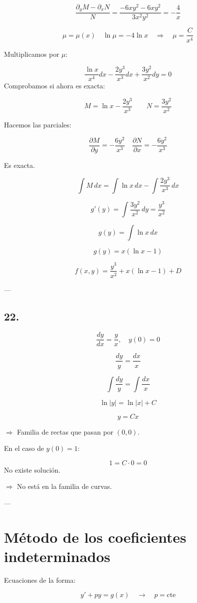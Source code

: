 \documentclass[a4paper,12pt]{article}
\begin{document}
\[
\frac{\partial_y M - \partial_x N}{N} = \frac{-6xy^2 - 6xy^2}{3x^2 y^2} = -\frac{4}{x}
\]

\[
\mu = \mu(x) \quad \ln \mu = -4 \ln x \quad \Rightarrow \quad \mu = \frac{C}{x^4}
\]

Multiplicamos por $\mu$:

\[
\frac{\ln x}{x^4} dx - \frac{2y^3}{x^3} dx + \frac{3y^2}{x^2} dy = 0
\]
Comprobamos si ahora es exacta:

\[
M = \ln x - \frac{2y^3}{x^3} 
\quad\quad 
N = \frac{3y^2}{x^2}
\]

Hacemos las parciales:

\[
\frac{\partial M}{\partial y} = -\frac{6y^2}{x^3} 
\quad 
\frac{\partial N}{\partial x} = -\frac{6y^2}{x^3}
\]

Es exacta.

\[
\int M\, dx = \int \ln x\, dx - \int \frac{2y^3}{x^3}\, dx
\]

\[
g'(y) = \int \frac{3y^2}{x^2}\, dy = \frac{y^3}{x^2}
\]

\[
g(y) = \int \ln x\, dx
\]

\[
g(y) = x (\ln x - 1)
\]

\[
f(x,y) = \frac{y^3}{x^2} + x(\ln x - 1) + D
\]

---

\subsection*{22.}
\[
\frac{dy}{dx} = \frac{y}{x}, \quad y(0) = 0
\]

\[
\frac{dy}{y} = \frac{dx}{x}
\]

\[
\int \frac{dy}{y} = \int \frac{dx}{x}
\]

\[
\ln |y| = \ln |x| + C
\]

\[
y = Cx
\]

$\Rightarrow$ Familia de rectas que pasan por $(0,0)$.

En el caso de $y(0) = 1$:

\[
1 = C \cdot 0 = 0
\]
No existe solución.

$\Rightarrow$ No está en la familia de curvas.

---

\section*{Método de los coeficientes indeterminados}

Ecuaciones de la forma:

\[
y' + p y = g(x) \quad \rightarrow \quad p = \text{cte}
\]
\end{document}

